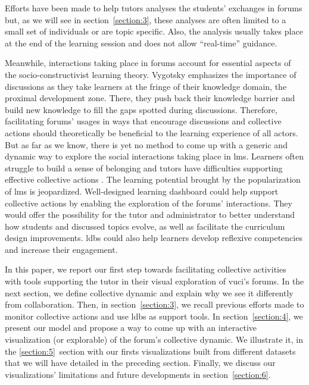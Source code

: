 \documentclass[a4paper,twoside]{article}
\begin{document}
Efforts have been made to help tutors analyses the students' exchanges in forums but, as we will see in section~\ref{section:3}, these analyses are often limited to a small set of individuals or are topic specific.  Also, the analysis usually takes place at the end of the learning session and does not allow ``real-time'' guidance.

Meanwhile, interactions taking place in forums account for essential aspects of the socio-constructivist learning theory.  Vygotsky emphasizes the importance of discussions as they take learners at the fringe of their knowledge domain, the proximal development zone.  There, they push back their knowledge barrier and build new knowledge to fill the gaps spotted during discussions.  Therefore, facilitating forums' usages in ways that encourage discussions and collective actions should theoretically be beneficial to the learning experience of all actors.  But as far as we know, there is yet no method to come up with a generic and dynamic way to explore the social interactions taking place in \gls{lms}.  Learners often struggle to build a sense of belonging \citep{Khalil2014} and tutors have difficulties supporting effective collective actions \citep{Zheng2015}.  The learning potential brought by the popularization of \gls{lms} is jeopardized.
Well-designed learning dashboard could help support collective actions by enabling the exploration of the forums' interactions.  They would offer the possibility for the tutor and administrator to better understand how students and discussed topics evolve, as well as facilitate the curriculum design improvements.  \glspl{ldb} could also help learners develop reflexive competencies and increase their engagement.


In this paper, we report our first step towards facilitating collective activities with tools supporting the tutor in their visual exploration of \gls{vuci}'s forums.
In the next section, we define collective dynamic and explain why we see it differently from collaboration.  Then, in section~\ref{section:3}, we recall previous efforts made to monitor collective actions and use \glspl{ldb} as support tools.  In section~\ref{section:4}, we present our model and propose a way to come up with an interactive visualization (or explorable) of the forum's collective dynamic.  We illustrate it, in the \ref{section:5}~section with our firsts visualizations built from different datasets that we will have detailed in the preceding section.  Finally, we discuss our visualizations' limitations and future developments in section~\ref{section:6}.
\end{document}

